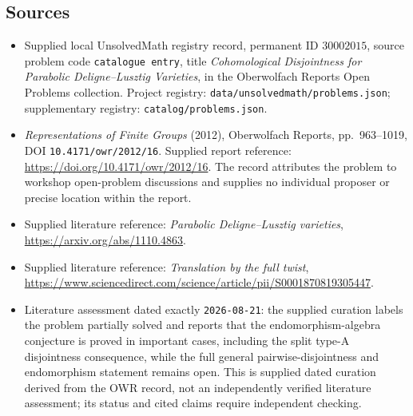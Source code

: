 \documentclass[11pt]{article}
\begin{document}
\subsection{Sources}
\begin{itemize}
\item Supplied local UnsolvedMath registry record, permanent ID \(30002015\), source problem code \texttt{catalogue entry}, title \emph{Cohomological Disjointness for Parabolic Deligne--Lusztig Varieties}, in the Oberwolfach Reports Open Problems collection. Project registry: \texttt{data/unsolvedmath/problems.json}; supplementary registry: \texttt{catalog/problems.json}.
\item \emph{Representations of Finite Groups} (2012), Oberwolfach Reports, pp.~963--1019, DOI \texttt{10.4171/owr/2012/16}. Supplied report reference: \url{https://doi.org/10.4171/owr/2012/16}. The record attributes the problem to workshop open-problem discussions and supplies no individual proposer or precise location within the report.
\item Supplied literature reference: \emph{Parabolic Deligne--Lusztig varieties}, \url{https://arxiv.org/abs/1110.4863}.
\item Supplied literature reference: \emph{Translation by the full twist}, \url{https://www.sciencedirect.com/science/article/pii/S0001870819305447}.
\item Literature assessment dated exactly \texttt{2026-08-21}: the supplied curation labels the problem partially solved and reports that the endomorphism-algebra conjecture is proved in important cases, including the split type-A disjointness consequence, while the full general pairwise-disjointness and endomorphism statement remains open. This is supplied dated curation derived from the OWR record, not an independently verified literature assessment; its status and cited claims require independent checking.
\end{itemize}
\end{document}
